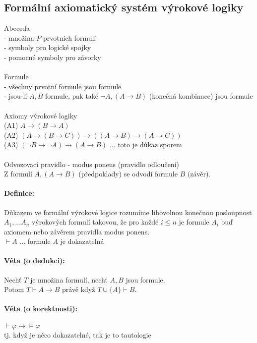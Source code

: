 \subsection*{Formální axiomatický systém výrokové logiky}
Abeceda\\
- množina $P$ prvotních formulí\\
- symboly pro logické spojky\\
- pomocné symboly pro závorky\\~\\
Formule\\
- všechny prvotní formule jsou formule\\
- jsou-li $A, B$ formule, pak také $\neg A, (A \rightarrow B)$ (konečná kombinace) jsou formule\\~\\
Axiomy výrokové logiky\\
(A1) $A \rightarrow (B \rightarrow A)$\\
(A2) $(A \rightarrow (B \rightarrow C)) \rightarrow (( A\rightarrow B) \rightarrow (A\rightarrow C)) $\\
(A3) $ (\neg B \rightarrow \neg A) \rightarrow (A\rightarrow B)$ ... toto je důkaz sporem\\~\\
Odvozovací pravidlo - modus ponens (pravidlo odloučení)\\
Z formulí $A, (A \rightarrow B)$ (předpoklady) se odvodí formule $B$ (závěr).

\paragraph*{Definice:}
Důkazem ve formální výrokové logice rozumíme libovolnou konečnou posloupnost $A_1 ,... A_n $ výrokových formulí takovou, že pro každé $i \leq n$ je formule $A_i$ buď axiomem nebo závěrem pravidla modus ponens.\\
$\vdash A$ ... formule $A$ je dokazatelná

\paragraph*{Věta (o dedukci):}
Nechť $T$ je množina formulí, nechť $A, B$ jsou formule.\\
Potom $T \vdash A \rightarrow B$ právě když $T \cup \{ A \} \vdash B$.

\paragraph*{Věta (o korektnosti):}
$\vdash \varphi \rightarrow \models \varphi$\\
tj. když je něco dokazatelné, tak je to tautologie

